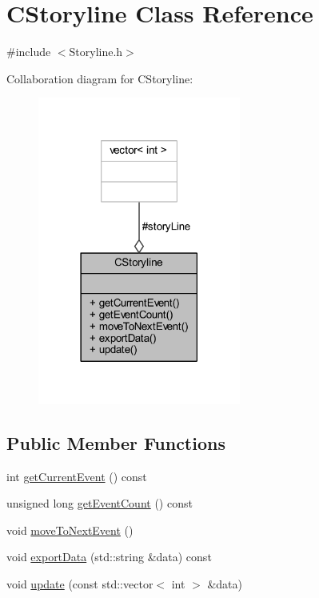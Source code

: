 \hypertarget{class_c_storyline}{}\section{C\+Storyline Class Reference}
\label{class_c_storyline}


{\ttfamily \#include $<$Storyline.\+h$>$}



Collaboration diagram for C\+Storyline\+:\nopagebreak
\begin{figure}[H]
\begin{center}
\leavevmode
\includegraphics[width=189pt]{class_c_storyline__coll__graph}
\end{center}
\end{figure}
\subsection*{Public Member Functions}
\begin{DoxyCompactItemize}
\item 
int \mbox{\hyperlink{class_c_storyline_a5de98e457a382194c6bcdcd57dda33c4}{get\+Current\+Event}} () const
\item 
unsigned long \mbox{\hyperlink{class_c_storyline_a9531c0509722bbb1647837d4549a9520}{get\+Event\+Count}} () const
\item 
void \mbox{\hyperlink{class_c_storyline_aea8684dfbe5f41a4443616eb8f7b7560}{move\+To\+Next\+Event}} ()
\item 
void \mbox{\hyperlink{class_c_storyline_aa8cb69bd93260855dc0221d901b1bd07}{export\+Data}} (std\+::string \&data) const
\item 
void \mbox{\hyperlink{class_c_storyline_ad8c62b61513d498b53454aeaf621dda0}{update}} (const std\+::vector$<$ int $>$ \&data)
\end{DoxyCompactItemize}
